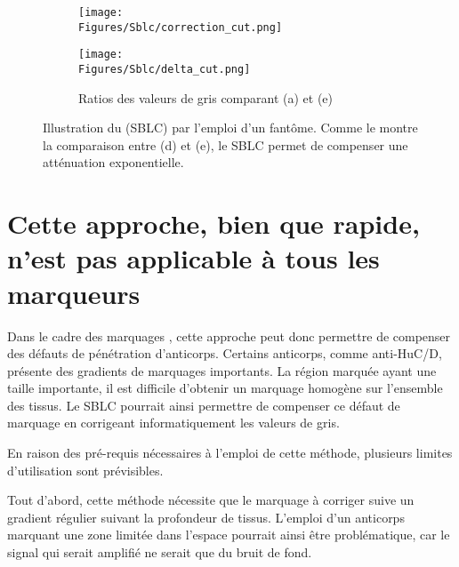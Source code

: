 \documentclass[\main/main.tex]{subfiles}
\begin{document}
\begin{figure}[h!]
\begin{subfigure}[b]{0.30\textwidth}
       \centering \texttt{[image: \\Figures/Sblc/correction\_cut.png]}
    \end{subfigure}
    \begin{subfigure}[b]{0.30\textwidth}
       \caption{
        \centering
            \label{fig:sblc:algo:ratio}
            Ratios des valeurs de gris comparant (a) et (e)
            }
       \centering \texttt{[image: \\Figures/Sblc/delta\_cut.png]}
    \end{subfigure}
    \caption{
        \label{fig:sblc:algo}
        Illustration du \sblc{} (SBLC) par l'emploi d'un fantôme.
        \newline
        Comme le montre la comparaison entre (d) et (e), le SBLC permet de compenser une atténuation exponentielle.
    }
\end{figure}


    \section{Cette approche, bien que rapide, n'est pas applicable à tous les marqueurs}
    

%
Dans le cadre des marquages \ihc{}, cette approche peut donc permettre de compenser des défauts de pénétration d'anticorps.
%
Certains anticorps, comme anti-HuC/D, présente des gradients de marquages importants.
%
La région marquée ayant une taille importante, il est difficile d'obtenir un marquage homogène sur l'ensemble des tissus.
%
Le SBLC pourrait ainsi permettre de compenser ce défaut de marquage en corrigeant informatiquement les valeurs de gris.

%
En raison des pré-requis nécessaires à l'emploi de cette méthode, plusieurs limites d'utilisation sont prévisibles.

%
Tout d'abord, cette méthode nécessite que le marquage à corriger suive un gradient régulier suivant la profondeur de tissus.
%
L'emploi d'un anticorps marquant une zone limitée dans l'espace pourrait ainsi être problématique, car le signal qui serait amplifié ne serait que du bruit de fond.
\end{document}
